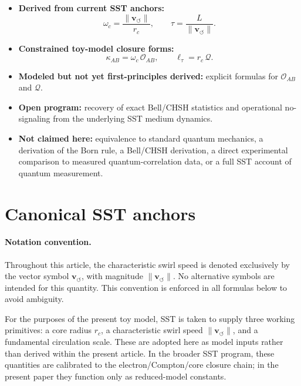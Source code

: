 \documentclass[11pt]{article}
\newcommand{\vnorm}{\lVert \mathbf{v}_{\!\boldsymbol{\circlearrowleft}}\rVert}
\newcommand{\rc}{r_c}
\begin{document}
        \begin{itemize}
            \item \textbf{Derived from current SST anchors:}
            \[
                \omega_c=\frac{\vnorm}{\rc},\qquad
                \tau=\frac{L}{\vnorm}.
            \]
            \item \textbf{Constrained toy-model closure forms:}
            \[
                \kappa_{AB}=\omega_c\,\mathcal{O}_{AB},\qquad
                \ell_\tau=\rc\,\mathcal{Q}.
            \]
            \item \textbf{Modeled but not yet first-principles derived:}
            explicit formulas for \(\mathcal{O}_{AB}\) and \(\mathcal{Q}\).
            \item \textbf{Open program:}
            recovery of exact Bell/CHSH statistics and operational no-signaling from the underlying SST medium dynamics.
            \item \textbf{Not claimed here:}
            equivalence to standard quantum mechanics, a derivation of the Born rule, a Bell/CHSH derivation, a direct experimental comparison to measured quantum-correlation data, or a full SST account of quantum measurement.
        \end{itemize}
    
    \section{Canonical SST anchors}
        
        \paragraph{Notation convention.}
        Throughout this article, the characteristic swirl speed is denoted exclusively by the vector symbol \(\mathbf{v}_{\!\boldsymbol{\circlearrowleft}}\), with magnitude \(\lVert \mathbf{v}_{\!\boldsymbol{\circlearrowleft}}\rVert\). No alternative symbols are intended for this quantity. This convention is enforced in all formulas below to avoid ambiguity.

        For the purposes of the present toy model, SST is taken to supply three working primitives: a core radius \(\rc\), a characteristic swirl speed \(\vnorm\), and a fundamental circulation scale. These are adopted here as model inputs rather than derived within the present article. In the broader SST program, these quantities are calibrated to the electron/Compton/core closure chain; in the present paper they function only as reduced-model constants.
\end{document}
